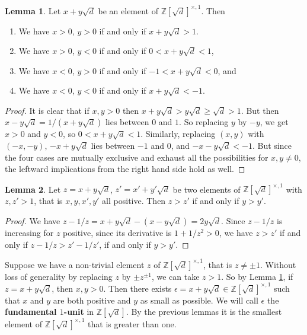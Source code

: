 \documentclass{article}
\newcommand{\Z}{\mathbb{Z}}
\newcommand{\rb}[1]{\left( #1 \right)}
\renewcommand{\sb}[1]{\left[ #1 \right]}
\theoremstyle{definition}\newtheorem{definition}{Definition}
\theoremstyle{definition}\newtheorem{remark}[definition]{Remark}
\theoremstyle{definition}\newtheorem*{example}{Example}
\theoremstyle{definition}\newtheorem*{note}{Note}
\newtheorem{lemma}[definition]{Lemma}
\begin{document}
\begin{lemma}
\label{lem:62}
Let $ x + y\sqrt{d} $ be an element of $ \Z\sb{\sqrt{d}}^{\times, 1} $. Then
\begin{enumerate}
\item We have $ x > 0 $, $ y > 0 $ if and only if $ x + y\sqrt{d} > 1 $.
\item We have $ x > 0 $, $ y < 0 $ if and only if $ 0 < x + y\sqrt{d} < 1 $,
\item We have $ x < 0 $, $ y > 0 $ if and only if $ -1 < x + y\sqrt{d} < 0 $, and
\item We have $ x < 0 $, $ y < 0 $ if and only if $ x + y\sqrt{d} < -1 $.
\end{enumerate}
\end{lemma}

\begin{proof}
It is clear that if $ x, y > 0 $ then $ x + y\sqrt{d} > y\sqrt{d} \ge \sqrt{d} > 1 $. But then $ x - y\sqrt{d} = 1 / \rb{x + y\sqrt{d}} $ lies between $ 0 $ and $ 1 $. So replacing $ y $ by $ -y $, we get $ x > 0 $ and $ y < 0 $, so $ 0 < x + y\sqrt{d} < 1 $. Similarly, replacing $ \rb{x, y} $ with $ \rb{-x, -y} $, $ -x + y\sqrt{d} $ lies between $ -1 $ and $ 0 $, and $ -x - y\sqrt{d} < -1 $. But since the four cases are mutually exclusive and exhaust all the possibilities for $ x, y \ne 0 $, the leftward implications from the right hand side hold as well.
\end{proof}

\begin{lemma}
\label{lem:63}
Let $ z = x + y\sqrt{d} $, $ z' = x' + y'\sqrt{d} $ be two elements of $ \Z\sb{\sqrt{d}}^{\times, 1} $ with $ z, z' > 1 $, that is $ x, y, x', y' $ all positive. Then $ z > z' $ if and only if $ y > y' $.
\end{lemma}

\begin{proof}
We have $ z - 1 / z = x + y\sqrt{d} - \rb{x - y\sqrt{d}} = 2y\sqrt{d} $. Since $ z - 1 / z $ is increasing for $ z $ positive, since its derivative is $ 1 + 1 / z^2 > 0 $, we have $ z > z' $ if and only if $ z - 1 / z > z' - 1 / z' $, if and only if $ y > y' $.
\end{proof}


Suppose we have a non-trivial element $ z $ of $ \Z\sb{\sqrt{d}}^{\times, 1} $, that is $ z \ne \pm 1 $. Without loss of generality by replacing $ z $ by $ \pm z^{\pm 1} $, we can take $ z > 1 $. So by Lemma \ref{lem:62}, if $ z = x + y\sqrt{d} $, then $ x, y > 0 $. Then there exists $ \epsilon = x + y\sqrt{d} \in \Z\sb{\sqrt{d}}^{\times, 1} $ such that $ x $ and $ y $ are both positive and $ y $ as small as possible. We will call $ \epsilon $ the \textbf{fundamental $ 1 $-unit} in $ \Z\sb{\sqrt{d}} $. By the previous lemmas it is the smallest element of $ \Z\sb{\sqrt{d}}^{\times, 1} $ that is greater than one.
\end{document}
